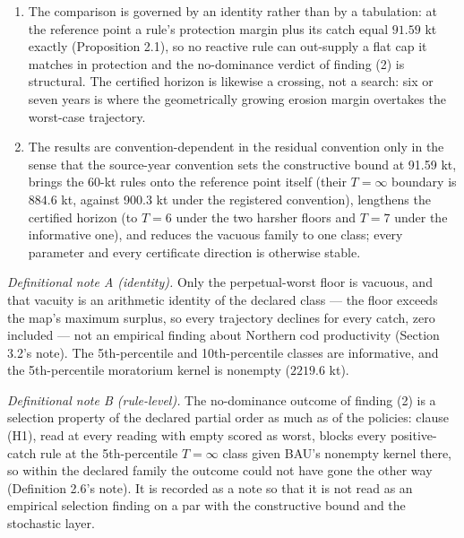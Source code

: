 \begin{enumerate}
  every constant catch from zero to \(150\) kt --- the
  moratorium included --- because the erosion margin's annual growth
  is \(379\)--\(773\) kt, four times the whole admissible catch
  range at its smallest. A review interval longer than that horizon is
  consulting an expired certificate.
\item
  The comparison is governed by an identity rather than by a tabulation:
  at the reference point a rule's protection margin plus its catch equal
  \(91.59\) kt exactly (Proposition 2.1), so no reactive rule can
  out-supply a flat cap it matches in protection and the no-dominance
  verdict of finding (2) is structural. The certified horizon is likewise
  a crossing, not a search: six or seven years is where the geometrically
  growing erosion margin overtakes the worst-case trajectory.
\item
  The results are convention-dependent in the residual convention only
  in the sense that the source-year convention sets the constructive
  bound at 91.59 kt, brings the 60-kt rules onto the reference point
  itself (their \(T=\infty\) boundary is \(884.6\) kt, against 900.3 kt
  under the registered convention), lengthens the certified horizon (to \(T=6\) under the two
  harsher floors and \(T=7\) under the informative one), and reduces
  the vacuous family to one class; every parameter and every certificate
  direction is otherwise stable.
\end{enumerate}

\emph{Definitional note A (identity).} Only the perpetual-worst floor is
vacuous, and that vacuity is an arithmetic identity of the declared
class --- the floor exceeds the map's maximum surplus, so every
trajectory declines for every catch, zero included --- not an empirical
finding about Northern cod productivity (Section 3.2's note). The
5th-percentile and 10th-percentile classes are informative, and the
5th-percentile moratorium kernel is nonempty (\(2219.6\) kt).

\emph{Definitional note B (rule-level).} The no-dominance outcome of
finding (2) is a selection property of the declared partial order as
much as of the policies: clause (H1), read at every reading with empty
scored as worst, blocks every positive-catch rule at the 5th-percentile
\(T=\infty\) class given BAU's nonempty kernel there, so within the
declared family the outcome could not have gone the other way
(Definition 2.6's note). It is recorded as a note so that it is not read
as an empirical selection finding on a par with the constructive bound
and the stochastic layer.


